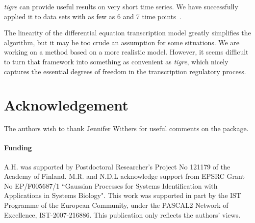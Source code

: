 \documentclass{bioinfo}
\newcommand{\tigre}{\emph{tigre}}
\begin{document}
\tigre{} can provide useful results on very short time series.  We
have successfully applied it to data sets with as few as 6 and 7 time
points~\citep{Honkela2010PNAS,Honkela2010MLSP}.

The linearity of the differential equation transcription model greatly
simplifies the algorithm, but it may be too crude an assumption for some
situations.  We are working on a method based on a more realistic
model.  However, it seems difficult to turn that framework into
something as convenient as \tigre{}, which nicely captures the
essential degrees of freedom in the transcription regulatory process.

\section*{Acknowledgement}

The authors wish to thank Jennifer Withers for useful comments on the
package.

\paragraph{Funding\textcolon}
A.H. was supported by Postdoctoral Researcher's Project No 121179 of the Academy of Finland.
M.R. and N.D.L acknowledge support from EPSRC Grant No EP/F005687/1 ``Gaussian Processes for Systems Identification with Applications in Systems Biology". 
This work was supported in part by the IST Programme of the European Community, under the PASCAL2 Network of Excellence, IST-2007-216886. This publication only reflects the authors' views.

\small



\end{document}
